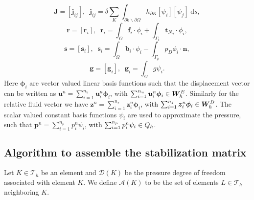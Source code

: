  \begin{equation*}
  \mathbf{J}=[\mathbf{j}_{ij}], \;\; \mathbf{j}_{ij}= \delta \sum_{K} \int_{\partial k \backslash \partial \Omega} h_{\partial K} [{\psi}_{i}][{\psi}_{j}] \;\mbox{d}s,
 \end{equation*}
  \begin{equation*}
  \mathbf{r}=[\mathbf{r}_{i}], \;\; \mathbf{r}_{i}=\int_{\Omega}  \mathbf{f}_{i} \cdot {\phi}_{i} + \int_{\Gamma_{t}}{\mathbf{t}_{N}}_{i} \cdot {\phi}_{i}, 
 \end{equation*}
  \begin{equation*}
  \mathbf{s}=[\mathbf{s}_{i}], \;\; \mathbf{s}_{i}=\int_{\Omega}  \mathbf{b}_{i} \cdot {\phi}_{i}-\int_{\Gamma_{p}} p_{D} {\phi}_{i} \cdot \mathbf{n},
 \end{equation*}
  \begin{equation*}
  \mathbf{g}=[\mathbf{g}_{i}], \;\; \mathbf{g}_{i}=\int_{\Omega}  g {\psi}_{i}.
 \end{equation*}
Here $\mathbf{\phi}_{i}$ are vector valued linear basis functions such that the displacement vector can be written as $\mathbf{u}^{n}= \sum_{i=1}^{n_{u}}\mathbf{u}^{n}_{i}\mathbf{\phi}_{i}$, with $\sum_{i=1}^{n_{u}}\boldsymbol{u}^{n}_{i}\boldsymbol{\phi}_{i} \in \boldsymbol{W}^{E}_{h}$. Similarly for the relative fluid vector we have $\mathbf{z}^{n}= \sum_{i=1}^{n_{z}}\mathbf{z}^{n}_{i}\mathbf{\phi}_{i}$, with $\sum_{i=1}^{n_{z}}\boldsymbol{z}^{n}_{i}\boldsymbol{\phi}_{i} \in \boldsymbol{W}^{D}_{h}$. The scalar valued constant basis functions ${\psi}_{i}$ are used to approximate the pressure, such that $\mathbf{p}^{n}= \sum_{i=1}^{n_{p}}{p}^{n}_{i}{\psi}_{i}$, with $\sum_{i=1}^{n_{p}}{p}^{n}_{i}{\psi}_{i} \in {Q}_{h}$.



\subsection{Algorithm to assemble the stabilization matrix}
\label{sec:stabilization}

Let $K \in \mathcal{T}_{h}$ be an element and $\mathcal{D}(K)$ be the pressure degree of freedom associated with element $K$.  We define $\mathcal{A}(K)$ to be the set of elements $L \in \mathcal{T}_{h}$ neighboring $K$.

